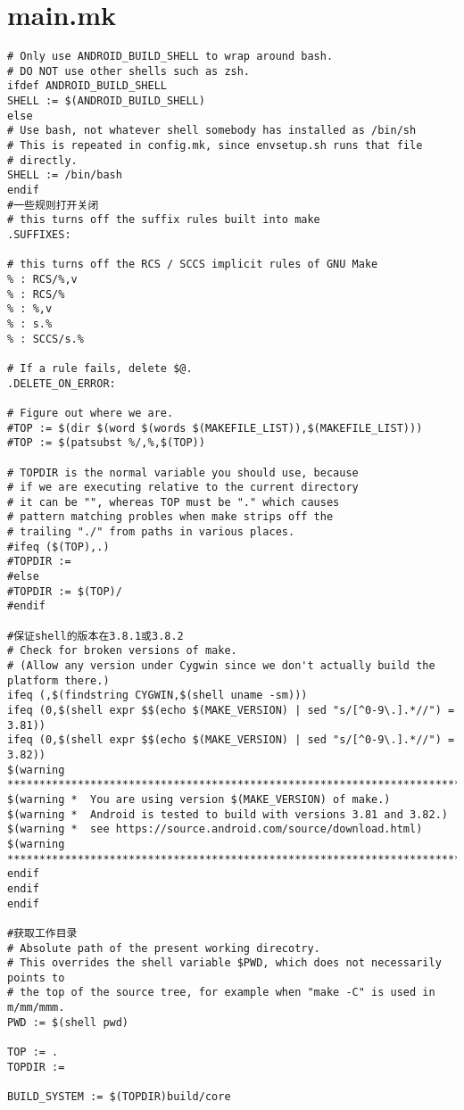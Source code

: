 \documentclass[12pt,a4paper]{article}
\begin{document}
\section{main.mk}
\begin{verbatim}
# Only use ANDROID_BUILD_SHELL to wrap around bash.
# DO NOT use other shells such as zsh.
ifdef ANDROID_BUILD_SHELL
SHELL := $(ANDROID_BUILD_SHELL)
else
# Use bash, not whatever shell somebody has installed as /bin/sh
# This is repeated in config.mk, since envsetup.sh runs that file
# directly.
SHELL := /bin/bash
endif
#一些规则打开关闭
# this turns off the suffix rules built into make
.SUFFIXES:

# this turns off the RCS / SCCS implicit rules of GNU Make
% : RCS/%,v
% : RCS/%
% : %,v
% : s.%
% : SCCS/s.%

# If a rule fails, delete $@.
.DELETE_ON_ERROR:

# Figure out where we are.
#TOP := $(dir $(word $(words $(MAKEFILE_LIST)),$(MAKEFILE_LIST)))
#TOP := $(patsubst %/,%,$(TOP))

# TOPDIR is the normal variable you should use, because
# if we are executing relative to the current directory
# it can be "", whereas TOP must be "." which causes
# pattern matching probles when make strips off the
# trailing "./" from paths in various places.
#ifeq ($(TOP),.)
#TOPDIR :=
#else
#TOPDIR := $(TOP)/
#endif

#保证shell的版本在3.8.1或3.8.2
# Check for broken versions of make.
# (Allow any version under Cygwin since we don't actually build the platform there.)
ifeq (,$(findstring CYGWIN,$(shell uname -sm)))
ifeq (0,$(shell expr $$(echo $(MAKE_VERSION) | sed "s/[^0-9\.].*//") = 3.81))
ifeq (0,$(shell expr $$(echo $(MAKE_VERSION) | sed "s/[^0-9\.].*//") = 3.82))
$(warning ********************************************************************************)
$(warning *  You are using version $(MAKE_VERSION) of make.)
$(warning *  Android is tested to build with versions 3.81 and 3.82.)
$(warning *  see https://source.android.com/source/download.html)
$(warning ********************************************************************************)
endif
endif
endif

#获取工作目录
# Absolute path of the present working direcotry.
# This overrides the shell variable $PWD, which does not necessarily points to
# the top of the source tree, for example when "make -C" is used in m/mm/mmm.
PWD := $(shell pwd)

TOP := .
TOPDIR :=

BUILD_SYSTEM := $(TOPDIR)build/core


\end{verbatim}
\end{document}
